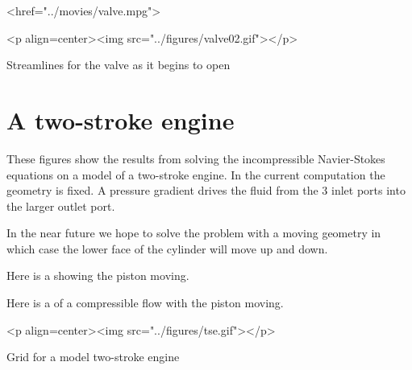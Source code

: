 \documentclass{article}
\begin{document}
\begin{rawhtml}
<href="../movies/valve.mpg">
\end{rawhtml}


\begin{rawhtml}
<p align=center><img src="../figures/valve02.gif"></p>
\end{rawhtml}
\begin{flushleft}
{\LARGE Streamlines for the valve as it begins to open}
\end{flushleft}

\section{A two-stroke engine}

These figures show the results from solving the incompressible
Navier-Stokes equations on a model of a two-stroke engine. In the
current computation the geometry is fixed. A pressure
gradient drives the fluid from the 3 inlet ports into 
the larger outlet port.

In the near future we hope
to solve the problem with a moving geometry in which case the
lower face of the cylinder will move up and down.

Here is a 
showing the piston moving.

Here is a 
of a compressible flow with the piston moving.


\begin{rawhtml}
<p align=center><img src="../figures/tse.gif"></p>
\end{rawhtml}
\begin{flushleft}
{\LARGE Grid for a model two-stroke engine} \\
~ \\   %
~ \\
~ \\
\end{flushleft}

\end{document}
